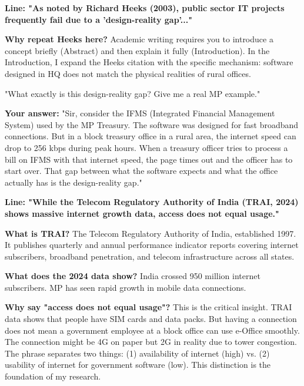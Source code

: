\documentclass[11pt,a4paper]{article}
\begin{document}
\textbf{Line: "As noted by Richard Heeks (2003), public sector IT projects frequently fail due to a 'design-reality gap'..."}

\begin{abox}
\textbf{Why repeat Heeks here?} Academic writing requires you to introduce a concept briefly (Abstract) and then explain it fully (Introduction). In the Introduction, I expand the Heeks citation with the specific mechanism: software designed in HQ does not match the physical realities of rural offices.

\begin{qbox}
"What exactly is this design-reality gap? Give me a real MP example."
\end{qbox}

\textbf{Your answer:} "Sir, consider the IFMS (Integrated Financial Management System) used by the MP Treasury. The software was designed for fast broadband connections. But in a block treasury office in a rural area, the internet speed can drop to 256 kbps during peak hours. When a treasury officer tries to process a bill on IFMS with that internet speed, the page times out and the officer has to start over. That gap between what the software expects and what the office actually has is the design-reality gap."
\end{abox}

\textbf{Line: "While the Telecom Regulatory Authority of India (TRAI, 2024) shows massive internet growth data, access does not equal usage."}

\begin{abox}
\textbf{What is TRAI?} The Telecom Regulatory Authority of India, established 1997. It publishes quarterly and annual performance indicator reports covering internet subscribers, broadband penetration, and telecom infrastructure across all states.

\textbf{What does the 2024 data show?} India crossed 950 million internet subscribers. MP has seen rapid growth in mobile data connections.

\textbf{Why say "access does not equal usage"?} This is the critical insight. TRAI data shows that people have SIM cards and data packs. But having a connection does not mean a government employee at a block office can use e-Office smoothly. The connection might be 4G on paper but 2G in reality due to tower congestion. The phrase separates two things: (1) availability of internet (high) vs. (2) usability of internet for government software (low). This distinction is the foundation of my research.
\end{abox}
\end{document}
